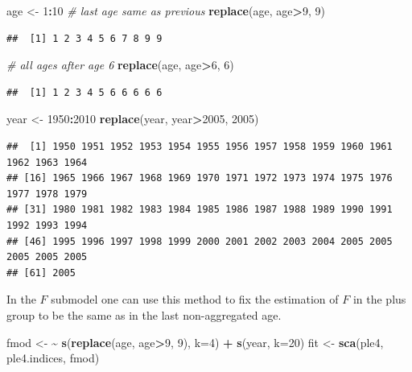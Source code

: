 \documentclass[
]{book}
\newenvironment{Shaded}{\begin{snugshade}}{\end{snugshade}}
\newcommand{\AttributeTok}[1]{\textcolor[rgb]{0.13,0.29,0.53}{#1}}
\newcommand{\CommentTok}[1]{\textcolor[rgb]{0.56,0.35,0.01}{\textit{#1}}}
\newcommand{\DecValTok}[1]{\textcolor[rgb]{0.00,0.00,0.81}{#1}}
\newcommand{\ErrorTok}[1]{\textcolor[rgb]{0.64,0.00,0.00}{\textbf{#1}}}
\newcommand{\FunctionTok}[1]{\textcolor[rgb]{0.13,0.29,0.53}{\textbf{#1}}}
\newcommand{\NormalTok}[1]{#1}
\newcommand{\OtherTok}[1]{\textcolor[rgb]{0.56,0.35,0.01}{#1}}
\newcommand{\SpecialCharTok}[1]{\textcolor[rgb]{0.81,0.36,0.00}{\textbf{#1}}}
\begin{document}
\begin{Shaded}
\begin{Highlighting}[]
\NormalTok{age }\OtherTok{\textless{}{-}} \DecValTok{1}\SpecialCharTok{:}\DecValTok{10}
\CommentTok{\# last age same as previous}
\FunctionTok{replace}\NormalTok{(age, age}\SpecialCharTok{\textgreater{}}\DecValTok{9}\NormalTok{, }\DecValTok{9}\NormalTok{)}
\end{Highlighting}
\end{Shaded}

\begin{verbatim}
##  [1] 1 2 3 4 5 6 7 8 9 9
\end{verbatim}

\begin{Shaded}
\begin{Highlighting}[]
\CommentTok{\# all ages after age 6}
\FunctionTok{replace}\NormalTok{(age, age}\SpecialCharTok{\textgreater{}}\DecValTok{6}\NormalTok{, }\DecValTok{6}\NormalTok{)}
\end{Highlighting}
\end{Shaded}

\begin{verbatim}
##  [1] 1 2 3 4 5 6 6 6 6 6
\end{verbatim}

\begin{Shaded}
\begin{Highlighting}[]
\NormalTok{year }\OtherTok{\textless{}{-}} \DecValTok{1950}\SpecialCharTok{:}\DecValTok{2010}
\FunctionTok{replace}\NormalTok{(year, year}\SpecialCharTok{\textgreater{}}\DecValTok{2005}\NormalTok{, }\DecValTok{2005}\NormalTok{)}
\end{Highlighting}
\end{Shaded}

\begin{verbatim}
##  [1] 1950 1951 1952 1953 1954 1955 1956 1957 1958 1959 1960 1961 1962 1963 1964
## [16] 1965 1966 1967 1968 1969 1970 1971 1972 1973 1974 1975 1976 1977 1978 1979
## [31] 1980 1981 1982 1983 1984 1985 1986 1987 1988 1989 1990 1991 1992 1993 1994
## [46] 1995 1996 1997 1998 1999 2000 2001 2002 2003 2004 2005 2005 2005 2005 2005
## [61] 2005
\end{verbatim}

In the \(F\) submodel one can use this method to fix the estimation of \(F\) in the plus group to be the same as in the last non-aggregated age.

\begin{Shaded}
\begin{Highlighting}[]
\NormalTok{fmod }\OtherTok{\textless{}{-}} \ErrorTok{\textasciitilde{}} \FunctionTok{s}\NormalTok{(}\FunctionTok{replace}\NormalTok{(age, age}\SpecialCharTok{\textgreater{}}\DecValTok{9}\NormalTok{, }\DecValTok{9}\NormalTok{), }\AttributeTok{k=}\DecValTok{4}\NormalTok{) }\SpecialCharTok{+} \FunctionTok{s}\NormalTok{(year, }\AttributeTok{k=}\DecValTok{20}\NormalTok{)}
\NormalTok{fit }\OtherTok{\textless{}{-}} \FunctionTok{sca}\NormalTok{(ple4, ple4.indices, fmod)}
\end{Highlighting}
\end{Shaded}
\end{document}
